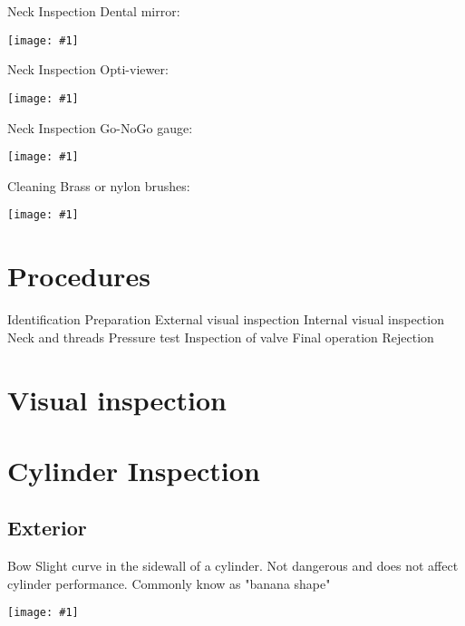 \documentclass[aspectratio=1610,english,12pt]{beamer}
\newcommand{\vipict}[1]{%
	\hfill
	\begin{center}
		\texttt{[image: \#1]}
	\end{center}
	\hfill 
}
\begin{document}
\begin{frame}{Neck Inspection}  
	Dental mirror:\\
	\vipict{../img/dental_mirror}
\end{frame}

\begin{frame}{Neck Inspection}  
	Opti-viewer:\\
	\vipict{../img/opti_viewer}	
\end{frame}

\begin{frame}{Neck Inspection}  
	Go-NoGo gauge:\\
	\vipict{../img/valve_go}	
\end{frame}

\begin{frame}{Cleaning}  
	Brass or nylon brushes:\\
	\vipict{../img/brass_brush}	
\end{frame}


\section{Procedures}
Identification
Preparation
External visual inspection
Internal visual inspection
Neck and threads
Pressure test
Inspection of valve
Final operation
Rejection



\section{Visual inspection}

\section{Cylinder Inspection}

\subsection{Exterior}
\begin{frame}{Bow}
	Slight curve in the sidewall of a cylinder. Not dangerous and does not affect cylinder performance. Commonly know as "banana shape"
	\vipict{../img/bow}
\end{frame}
\end{document}
